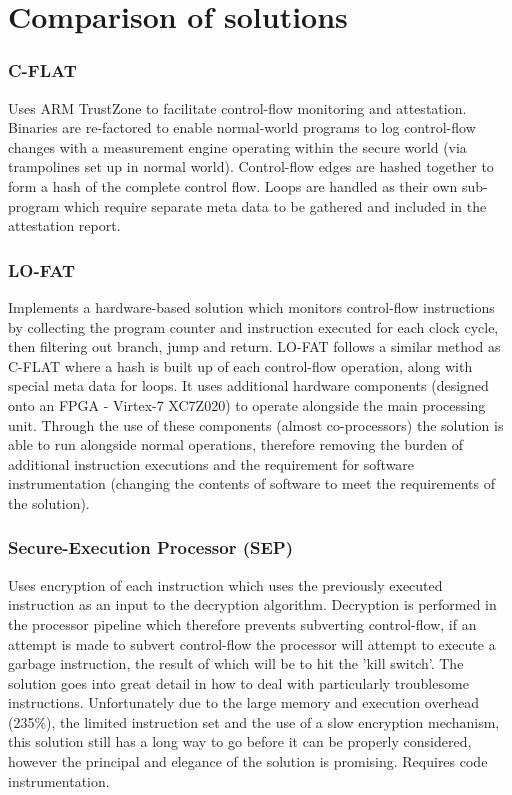 \section{Comparison of solutions}

\subsubsection{C-FLAT}
Uses ARM TrustZone to facilitate control-flow monitoring and attestation. Binaries are re-factored to enable normal-world programs to log control-flow changes with a measurement engine operating within the secure world (via trampolines set up in normal world). Control-flow edges are hashed together to form a hash of the complete control flow. Loops are handled as their own sub-program which require separate meta data to be gathered and included in the attestation report.

\subsubsection{LO-FAT}
Implements a hardware-based solution which monitors control-flow instructions by collecting the program counter and instruction executed for each clock cycle, then filtering out branch, jump and return. LO-FAT follows a similar method as C-FLAT where a hash is built up of each control-flow operation, along with special meta data for loops. It uses additional hardware components (designed onto an FPGA - Virtex-7 XC7Z020) to operate alongside the main processing unit. Through the use of these components (almost co-processors) the solution is able to run alongside normal operations, therefore removing the burden of additional instruction executions and the requirement for software instrumentation (changing the contents of software to meet the requirements of the solution).

\subsubsection{Secure-Execution Processor (SEP)}
Uses encryption of each instruction which uses the previously executed instruction as an input to the decryption algorithm. Decryption is performed in the processor pipeline which therefore prevents subverting control-flow, if an attempt is made to subvert control-flow the processor will attempt to execute a garbage instruction, the result of which will be to hit the 'kill switch'. The solution goes into great detail in how to deal with particularly troublesome instructions. Unfortunately due to the large memory and execution overhead (235\%), the limited instruction set and the use of a slow encryption mechanism, this solution still has a long way to go before it can be properly considered, however the principal and elegance of the solution is promising. Requires code instrumentation.

